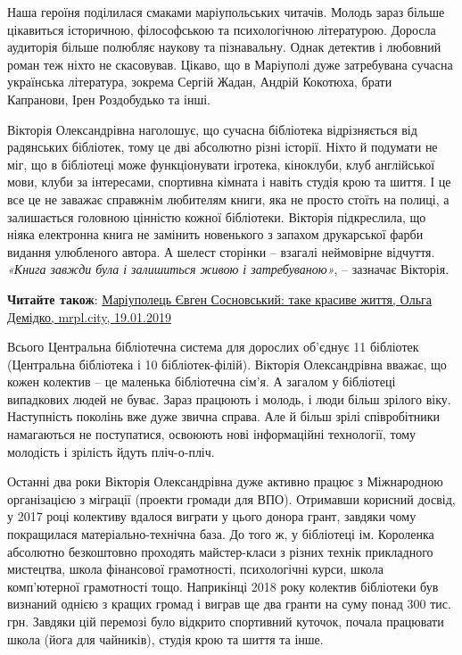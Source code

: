 Наша героїня поділилася смаками маріупольських читачів. Молодь зараз більше
цікавиться історичною, філософською та психологічною літературою. Доросла
аудиторія більше полюбляє наукову та пізнавальну. Однак детектив і любовний
роман теж ніхто не скасовував. Цікаво, що в Маріуполі дуже затребувана сучасна
українська література, зокрема Сергій Жадан, Андрій Кокотюха, брати Капранови,
Ірен Роздобудько та інші.


Вікторія Олександрівна наголошує, що сучасна бібліотека відрізняється від
радянських бібліотек, тому це дві абсолютно різні історії. Ніхто й подумати не
міг, що в бібліотеці може функціонувати ігротека, кіноклуби, клуб англійської
мови, клуби за інтересами, спортивна кімната і навіть студія крою та шиття. І
це все це не заважає справжнім любителям книги, яка не просто стоїть на полиці,
а залишається головною цінністю кожної бібліотеки. Вікторія підкреслила, що
ніяка електронна книга не замінить новенького з запахом друкарської фарби
видання улюбленого автора. А шелест сторінки – взагалі неймовірне відчуття.
\emph{«Книга завжди була і залишиться живою і затребуваною»}, – зазначає Вікторія.

\textbf{Читайте також}: \href{https://mrpl.city/blogs/view/mariupolets-evgen-sosnovskij-take-krasive-zhittya}{%
Маріуполець Євген Сосновський: таке красиве життя, %
Ольга Демідко, mrpl.city, 19.01.2019}

Всього Центральна бібліотечна система для дорослих об'єднує 11 бібліотек
(Центральна бібліотека і 10 бібліотек-філій). Вікторія Олександрівна вважає, що
кожен колектив – це маленька бібліотечна сім'я. А загалом у бібліотеці
випадкових людей не буває. Зараз працюють і молодь, і люди більш зрілого віку.
Наступність поколінь вже дуже звична справа. Але й більш зрілі співробітники
намагаються не поступатися, освоюють нові інформаційні технології, тому
молодість і зрілість йдуть пліч-о-пліч.


Останні два роки Вікторія Олександрівна дуже активно працює з Міжнародною
організацією з міграції (проекти громади для ВПО). Отримавши корисний досвід, у
2017 році колективу вдалося виграти у цього донора грант, завдяки чому
покращилася матеріально-технічна база. До того ж, у бібліотеці ім. Короленка
абсолютно безкоштовно проходять майстер-класи з різних технік прикладного
мистецтва, школа фінансової грамотності, психологічні курси, школа комп’ютерної
грамотності тощо. Наприкінці 2018 року колектив бібліотеки був визнаний однією
з кращих громад і виграв ще два гранти на суму понад 300 тис. грн. Завдяки цій
перемозі було відкрито спортивний куточок, почала працювати школа (йога для
чайників), студія крою та шиття та інше.

